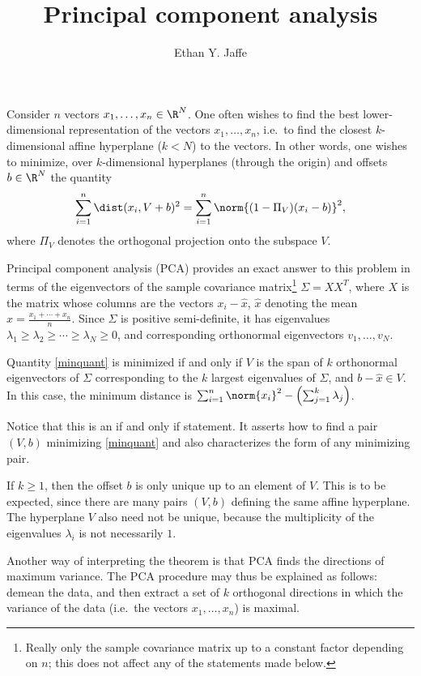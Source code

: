 \documentclass[12pt]{article}
\title{Principal component analysis}
\author{Ethan Y. Jaffe}
\date{}
\begin{document}
\maketitle

Consider $n$ vectors $x_1,\ldots,x_n \in \R^N$. One often wishes to find the best lower-dimensional representation of the vectors $x_1,\ldots,x_n$, i.e.\ to find the closest $k$-dimensional affine hyperplane ($k < N$) to the vectors. In other words, one wishes to minimize, over $k$-dimensional hyperplanes (through the origin) and offsets $b \in \R^N$ the quantity
\begin{equation}\label{minquant}\sum_{i=1}^n \dist(x_i,V+b)^2 = \sum_{i=1}^n \norm{(1-\Pi_V)(x_i-b)}^2,\end{equation}
where $\Pi_V$ denotes the orthogonal projection onto the subspace $V$. 

Principal component analysis (PCA) provides an exact answer to this problem in terms of the eigenvectors of the sample covariance matrix\footnote{Really only the sample covariance matrix up to a constant factor depending on $n$; this does not affect any of the statements made below.} $\Sigma = XX^T$, where $X$ is the matrix whose columns are the vectors $x_i - \hat{x}$, $\hat{x}$ denoting the mean $\hat{x} = \frac{x_1+\cdots+x_n}{n}$. Since $\Sigma$ is positive semi-definite, it has eigenvalues $\lambda_1 \geq \lambda_2 \geq \cdots \geq \lambda_N \geq 0$, and corresponding orthonormal eigenvectors $v_1,\ldots,v_N$.

\begin{thm}[PCA]Quantity \eqref{minquant} is minimized if and only if $V$ is the span of $k$ orthonormal eigenvectors of $\Sigma$ corresponding to the $k$ largest eigenvalues of $\Sigma$, and $b-\hat{x} \in V$. In this case, the minimum distance is $\sum_{i=1}^n \norm{x_i}^2 - \left(\sum_{j=1}^k \lambda_j\right)$.
\end{thm}
\begin{rk}Notice that this is an if and only if statement. It asserts how to find a pair $(V,b)$ minimizing \eqref{minquant} and also characterizes the form of any minimizing pair.\end{rk}
\begin{rk}If $k \geq 1$, then the offset $b$ is only unique up to an element of $V$. This is to be expected, since there are many pairs $(V,b)$ defining the same affine hyperplane. The hyperplane $V$ also need not be unique, because the multiplicity of the eigenvalues $\lambda_i$ is not necessarily $1$.\end{rk}
\begin{rk}Another way of interpreting the theorem is that PCA finds the directions of maximum variance. The PCA procedure may thus be explained as follows: demean the data, and then extract a set of $k$ orthogonal directions in which the variance of the data (i.e.\ the vectors $x_1,\ldots, x_n$) is maximal.\end{rk}
\end{document}
